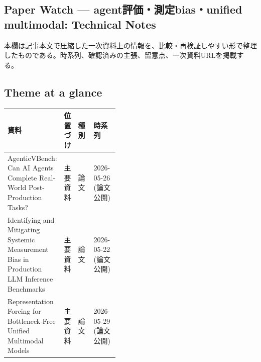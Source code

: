 \subsection*{Paper Watch — agent評価・測定bias・unified multimodal: Technical Notes}
本欄は記事本文で圧縮した一次資料上の情報を、比較・再検証しやすい形で整理したものである。時系列、確認済みの主張、留意点、一次資料URLを掲載する。
\medskip
\subsection*{Theme at a glance}
\begin{center}
\footnotesize
\begin{tabularx}{\linewidth}{@{}p{0.20\linewidth}p{0.10\linewidth}p{0.14\linewidth}X@{}}
\toprule
資料 & 位置づけ & 種別 & 時系列 \\
\midrule
AgenticVBench: Can AI Agents Complete Real-World Post-Production Tasks? & 主要資料 & 論文 & 2026-05-26 (論文公開) \\
Identifying and Mitigating Systemic Measurement Bias in Production LLM Inference Benchmarks & 主要資料 & 論文 & 2026-05-22 (論文公開) \\
Representation Forcing for Bottleneck-Free Unified Multimodal Models & 主要資料 & 論文 & 2026-05-29 (論文公開) \\
\bottomrule
\end{tabularx}
\end{center}
\normalsize

